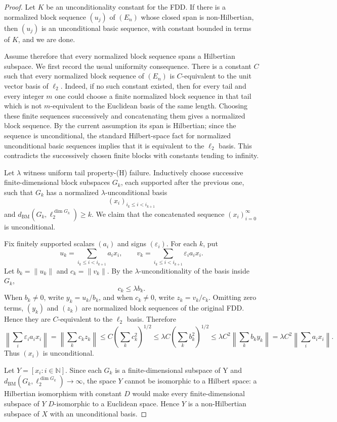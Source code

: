 \documentclass[11pt]{article}
\newcommand{\N}{\mathbb N}
\newcommand{\BM}{d_{\mathrm{BM}}}
\begin{document}
\begin{proof}
Let \(K\) be an unconditionality constant for the FDD. If there is a
normalized block sequence \((u_j)\) of \((E_n)\) whose closed span is
non-Hilbertian, then \((u_j)\) is an unconditional basic sequence, with
constant bounded in terms of \(K\), and we are done.

Assume therefore that every normalized block sequence spans a Hilbertian
subspace. We first record the usual uniformity consequence. There is a
constant \(C\) such that every normalized block sequence of \((E_n)\) is
\(C\)-equivalent to the unit vector basis of \(\ell_2\). Indeed, if no such
constant existed, then for every tail and every integer \(m\) one could choose
a finite normalized block sequence in that tail which is not \(m\)-equivalent
to the Euclidean basis of the same length. Choosing these finite sequences
successively and concatenating them gives a normalized block sequence. By the
current assumption its span is Hilbertian; since the sequence is unconditional,
the standard Hilbert-space fact for normalized unconditional basic sequences
implies that it is equivalent to the \(\ell_2\) basis. This contradicts the
successively chosen finite blocks with constants tending to infinity.

Let \(\lambda\) witness uniform tail property-(H) failure. Inductively choose
successive finite-dimensional block subspaces \(G_k\), each supported after
the previous one, such that \(G_k\) has a normalized
\(\lambda\)-unconditional basis
\[
(x_i)_{i_k\le i<i_{k+1}}
\]
and \(\BM(G_k,\ell_2^{\dim G_k})\ge k\). We claim that the concatenated
sequence \((x_i)_{i=0}^\infty\) is unconditional.

Fix finitely supported scalars \((a_i)\) and signs \((\varepsilon_i)\). For
each \(k\), put
\[
u_k=\sum_{i_k\le i<i_{k+1}} a_i x_i,\qquad
v_k=\sum_{i_k\le i<i_{k+1}} \varepsilon_i a_i x_i.
\]
Let \(b_k=\|u_k\|\) and \(c_k=\|v_k\|\). By the
\(\lambda\)-unconditionality of the basis inside \(G_k\),
\[
c_k\le \lambda b_k.
\]
When \(b_k\ne0\), write \(y_k=u_k/b_k\), and when \(c_k\ne0\), write
\(z_k=v_k/c_k\). Omitting zero terms, \((y_k)\) and \((z_k)\) are normalized
block sequences of the original FDD. Hence they are \(C\)-equivalent to the
\(\ell_2\) basis. Therefore
\[
\left\|\sum_i \varepsilon_i a_i x_i\right\|
=\left\|\sum_k c_k z_k\right\|
\le C\left(\sum_k c_k^2\right)^{1/2}
\le \lambda C\left(\sum_k b_k^2\right)^{1/2}
\le \lambda C^2\left\|\sum_k b_k y_k\right\|
=\lambda C^2\left\|\sum_i a_i x_i\right\|.
\]
Thus \((x_i)\) is unconditional.

Let \(Y=[x_i:i\in\N]\). Since each \(G_k\) is a finite-dimensional subspace of
Y and \(\BM(G_k,\ell_2^{\dim G_k})\to\infty\), the space \(Y\) cannot be
isomorphic to a Hilbert space: a Hilbertian isomorphism with constant \(D\)
would make every finite-dimensional subspace of \(Y\) \(D\)-isomorphic to a
Euclidean space. Hence \(Y\) is a non-Hilbertian subspace of \(X\) with an
unconditional basis.
\end{proof}
\end{document}
